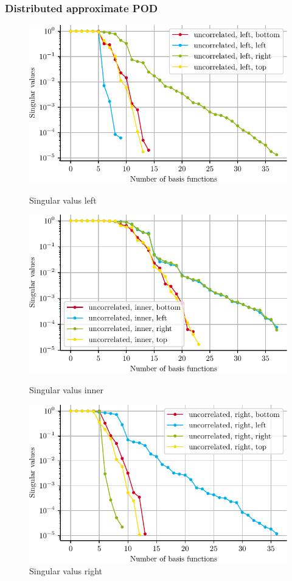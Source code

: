 \documentclass[a4paper]{eccomas_paper-2024}
\begin{document}
\subsubsection{Distributed approximate POD}

\begin{figure}[!htb]
  \includegraphics[width=\linewidth]{../figures/beam/fig_loc_svals_left.pdf}
  \caption{Singular valus left}\label{fig:loc_svals_left}
\endminipage\hfill
{}
  \includegraphics[width=\linewidth]{../figures/beam/fig_loc_svals_inner.pdf}
  \caption{Singular valus inner}\label{fig:loc_svals_inner}
\endminipage\hfill
{}%
  \includegraphics[width=\linewidth]{../figures/beam/fig_loc_svals_right.pdf}
  \caption{Singular valus right}\label{fig:loc_svals_right}
\endminipage
\end{figure}
\end{document}
